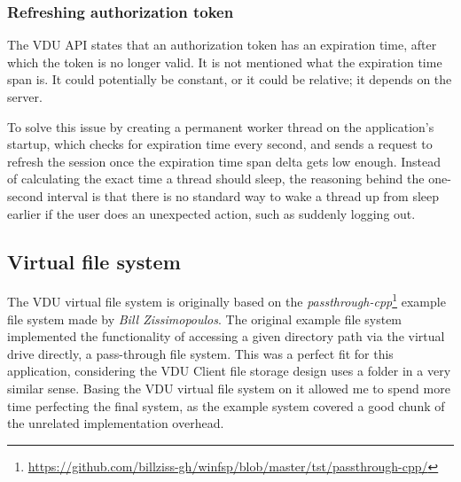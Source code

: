 \subsubsection{Refreshing authorization token}
The VDU API states that an authorization token has an expiration time, after which the token is no longer valid. It is not mentioned what the expiration time span is. It could potentially be constant, or it could be relative; it depends on the server.

To solve this issue by creating a permanent worker thread on the application's startup, which checks for expiration time every second, and sends a request to refresh the session once the expiration time span delta gets low enough. Instead of calculating the exact time a thread should sleep, the reasoning behind the one-second interval is that there is no standard way to wake a thread up from sleep earlier if the user does an unexpected action, such as suddenly logging out. 

\subsection{Virtual file system}
The VDU virtual file system is originally based on the \textit{passthrough-cpp}\footnote{\url{https://github.com/billziss-gh/winfsp/blob/master/tst/passthrough-cpp/}} example file system made by \textit{Bill Zissimopoulos}. The original example file system implemented the functionality of accessing a given directory path via the virtual drive directly, a pass-through file system. This was a perfect fit for this application, considering the VDU Client file storage design uses a folder in a very similar sense. Basing the VDU virtual file system on it allowed me to spend more time perfecting the final system, as the example system covered a good chunk of the unrelated implementation overhead.

